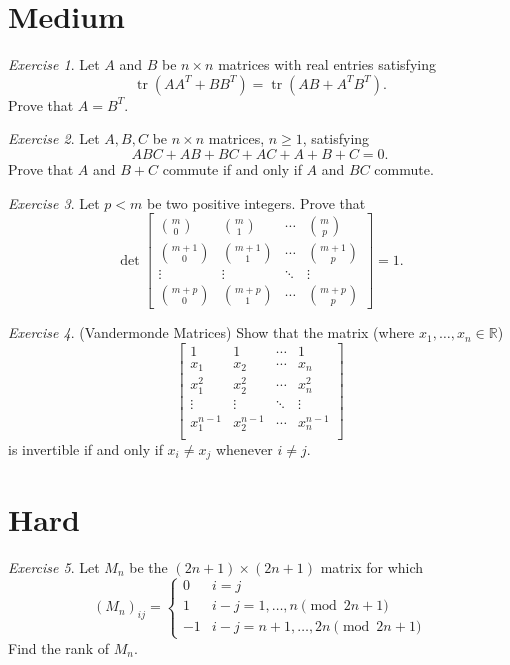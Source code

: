 \documentclass{article}
\theoremstyle{definition}
\theoremstyle{remark}
\newtheorem{exercise}{Exercise}
\DeclareMathOperator{\tr}{tr}
\begin{document}
\section{Medium}
\begin{exercise}
Let $A$ and $B$ be $n \times n$ matrices with real entries satisfying 
\[\tr(A A^{T} + B B^{T}) = \tr(AB + A^{T}B^{T}).  
\]
Prove that $A = B^{T}$. 
\end{exercise}

\begin{exercise}
    Let $A, B, C$ be $n \times n$ matrices, $n \geq 1$, satisfying 
\[ABC + AB + BC + AC + A + B + C = 0.
\]
Prove that $A$ and $B + C$ commute if and only if $A$ and $BC$ commute. 
\end{exercise}

\begin{exercise}
Let $p < m$ be two positive integers. Prove that 
\[\det \begin{bmatrix}
\binom{m}{0}&\binom{m}{1}&\cdots&\binom{m}{p}\\
\binom{m + 1}{0}&\binom{m + 1}{1}&\cdots&\binom{m + 1}{p}\\
\vdots&\vdots&\ddots&\vdots\\
\binom{m + p}{0}&\binom{m + p}{1}&\cdots&\binom{m + p}{p} 
\end{bmatrix} = 1.
\]
\end{exercise}

\begin{exercise}
(Vandermonde Matrices) Show that the matrix (where $x_{1}, \ldots, x_{n} \in \mathbb{R}$)
\[\begin{bmatrix}
1&1&\cdots&1\\
x_{1}&x_{2}&\cdots&x_{n}\\
x_{1}^{2}&x_{2}^{2}&\cdots&x_{n}^{2}\\
\vdots&\vdots&\ddots&\vdots\\
x_{1}^{n - 1}&x_{2}^{n - 1}&\cdots&x_{n}^{n - 1}\\
\end{bmatrix}
\]
is invertible if and only if $x_{i} \neq x_{j}$ whenever $i \neq j$. 
\end{exercise}

\section{Hard}

\begin{exercise}
Let $M_n$ be the $(2n+1)\times (2n+1)$ matrix for which \[(M_n)_{ij}=\begin{cases} 0 & i=j \\
1 & i-j=1,\dots,n \pmod{2n+1} \\ -1 & i-j=n+1,\dots,2n \pmod{2n+1}\end{cases}\] Find the rank of $M_n$.
\end{exercise}
\end{document}

